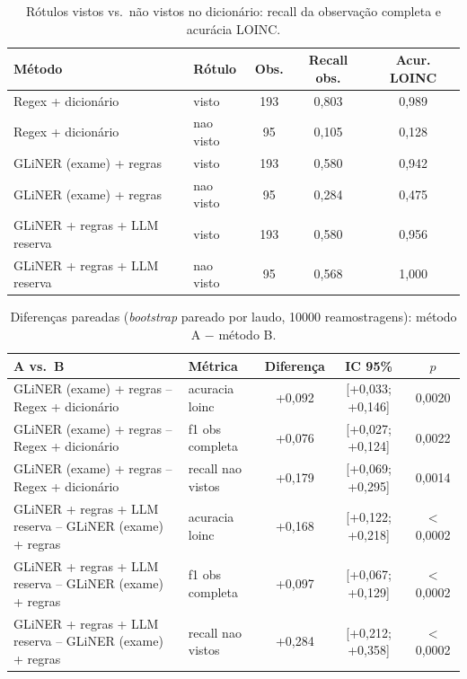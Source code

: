 \begin{table}[ht]\centering\small
\caption{Rótulos vistos vs.\ não vistos no dicionário: recall da observação completa e acurácia LOINC.}\label{tab:vistos}
\begin{tabular}{llccc}\toprule
Método & Rótulo & Obs. & Recall obs. & Acur. LOINC\\\midrule
Regex + dicionário & visto & 193 & 0,803 & 0,989\\
Regex + dicionário & nao visto & 95 & 0,105 & 0,128\\
GLiNER (exame) + regras & visto & 193 & 0,580 & 0,942\\
GLiNER (exame) + regras & nao visto & 95 & 0,284 & 0,475\\
GLiNER + regras + LLM reserva & visto & 193 & 0,580 & 0,956\\
GLiNER + regras + LLM reserva & nao visto & 95 & 0,568 & 1,000\\
\bottomrule\end{tabular}\end{table}

\begin{table}[ht]\centering\small
\caption{Diferenças pareadas (\textit{bootstrap} pareado por laudo, 10000 reamostragens): método A $-$ método B.}\label{tab:dif}
\begin{tabular}{llccc}\toprule
A vs.\ B & Métrica & Diferença & IC 95\% & $p$\\\midrule
GLiNER (exame) + regras -- Regex + dicionário & acuracia loinc & +0,092 & [+0,033; +0,146] & 0,0020\\
GLiNER (exame) + regras -- Regex + dicionário & f1 obs completa & +0,076 & [+0,027; +0,124] & 0,0022\\
GLiNER (exame) + regras -- Regex + dicionário & recall nao vistos & +0,179 & [+0,069; +0,295] & 0,0014\\
GLiNER + regras + LLM reserva -- GLiNER (exame) + regras & acuracia loinc & +0,168 & [+0,122; +0,218] & $<$0,0002\\
GLiNER + regras + LLM reserva -- GLiNER (exame) + regras & f1 obs completa & +0,097 & [+0,067; +0,129] & $<$0,0002\\
GLiNER + regras + LLM reserva -- GLiNER (exame) + regras & recall nao vistos & +0,284 & [+0,212; +0,358] & $<$0,0002\\
\bottomrule\end{tabular}\end{table}
